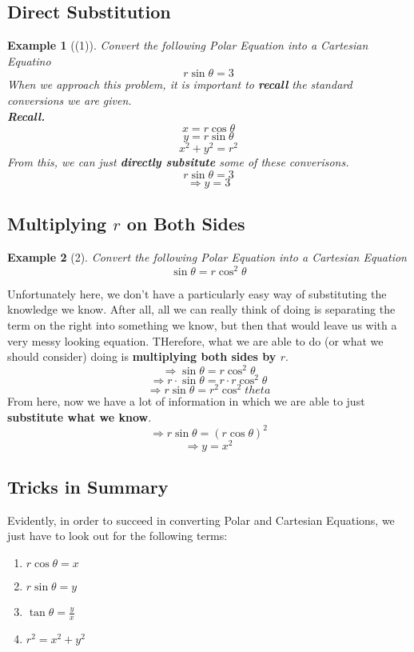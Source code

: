 \documentclass{report}
\newtheorem*{remark*}{Example}
\begin{document}
\begin{sloppypar}
\subsection{Direct Substitution}
\begin{remark*}[(1)]
  Convert the following Polar Equation into a
  Cartesian Equatino
  \[ r\sin{\theta} = 3 \]
  When we approach this problem, it is important
  to \textbf{recall} the standard conversions
  we are given.\\
  \textbf{Recall.}
  \[ x = r\cos{\theta}\]
  \[ y = r\sin{\theta}\]
  \[ x^{2} + y^{2} = r^{2}\]
  From this, we can just \textbf{directly
    subsitute} some of these converisons.
  \[ r\sin{\theta} = 3\]
  \[ \Rightarrow y = 3 \]


\end{remark*}
\subsection{Multiplying $ r $ on Both Sides}
\begin{remark*}[2]
  Convert the following Polar Equation into
  a Cartesian Equation
  \[ \sin{\theta} = r\cos^{2}{\theta}\]
\end{remark*}
Unfortunately here, we don't have a particularly
easy way of substituting the knowledge we know.
After all, all we can really think of doing is
separating the term on the right into something
we know, but then that would leave us with a
very messy looking equation. THerefore, what we
are able to do (or what we should consider)
doing is \textbf{multiplying both sides by $r$}.
\[ \Rightarrow \sin{\theta} = r\cos^{2}{\theta}\]
\[ \Rightarrow r \cdot \sin{\theta} = r \cdot r\cos^{2}{\theta}\]
\[ \Rightarrow r\sin{\theta} = r^{2}\cos^{2}{theta}\]
From here, now we have a lot of
information in which we are able to just
\textbf{substitute what we know}.
\[ \Rightarrow r\sin{\theta} = (r\cos{\theta})^{2}\]
\[ \Rightarrow y = x^{2} \]

\subsection{Tricks in Summary}
Evidently, in order to succeed in converting
Polar and Cartesian Equations, we just
have to look out for the following
terms:
\begin{enumerate}
  \item  $r\cos{\theta} = x$
  \item $r\sin{\theta} = y$
  \item $ \tan{\theta} = \frac{y}{x}$
  \item $r^2 = x^{2} + y^{2} $


\end{enumerate}
\end{sloppypar}
\end{document}
